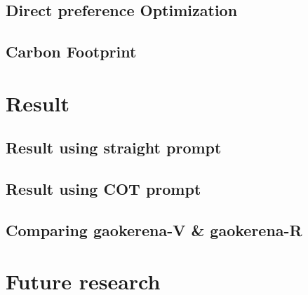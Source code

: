 \documentclass[conference]{IEEEtran}
\begin{document}
           \subsection{Direct preference Optimization}
           \subsection{Carbon Footprint}

            \section{Result}
             \subsection{Result using straight prompt}
            \subsection{Result using COT prompt}
            \subsection{Comparing gaokerena-V \& gaokerena-R }

            \section{Future research}
	
	
	
\end{document}
